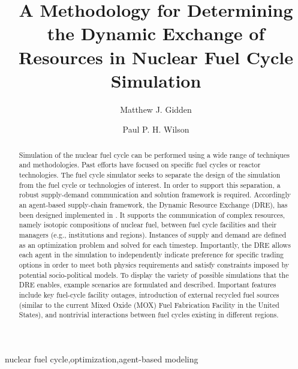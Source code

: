

\begin{frontmatter}

\title{A Methodology for Determining the Dynamic Exchange of Resources in
  Nuclear Fuel Cycle Simulation}

\author[iiasa]{Matthew J. Gidden}
\address[iiasa]{International Institute for Applied Systems Analysis,
  Schlossplatz 1, A-2361 Laxenburg, Austria}
\author[uw]{Paul P. H. Wilson}
\address[uw]{University of Wisconsin - Madison, Department of Nuclear
  Engineering and Engineering Physics, Madison, WI 53706}

\begin{abstract}
Simulation of the nuclear fuel cycle can be performed using a wide range of
techniques and methodologies. Past efforts have focused on specific fuel cycles
or reactor technologies. The \Cyclus fuel cycle simulator seeks to separate the
design of the simulation from the fuel cycle or technologies of interest. In
order to support this separation, a robust supply-demand communication and
solution framework is required. Accordingly an agent-based supply-chain
framework, the Dynamic Resource Exchange (DRE), has been designed implemented in
\Cyclus. It supports the communication of complex resources, namely isotopic
compositions of nuclear fuel, between fuel cycle facilities and their managers
(e.g., institutions and regions). Instances of supply and demand are defined as
an optimization problem and solved for each timestep. Importantly, the DRE
allows each agent in the simulation to independently indicate preference for
specific trading options in order to meet both physics requirements and satisfy
constraints imposed by potential socio-political models.  To display the variety
of possible simulations that the DRE enables, example scenarios are formulated
and described. Important features include key fuel-cycle facility outages,
introduction of external recycled fuel sources (similar to the current Mixed
Oxide (MOX) Fuel Fabrication Facility in the United States), and nontrivial
interactions between fuel cycles existing in different regions.
\end{abstract}

\begin{keyword}
nuclear fuel cycle\sep  optimization\sep agent-based modeling
\end{keyword}

\end{frontmatter}

\linenumbers
